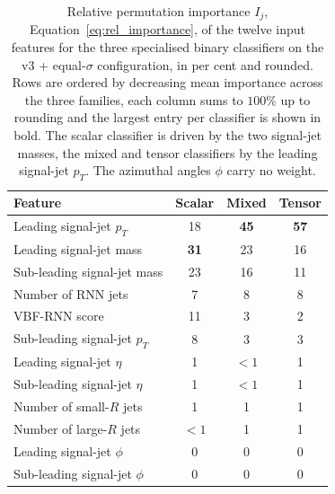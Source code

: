 \begin{table}[htbp]
  \centering
  \caption{Relative permutation importance $I_j$, Equation~\eqref{eq:rel_importance}, of the twelve input features for the three specialised binary classifiers on the v3 + equal-$\sigma$ configuration, in per cent and rounded. Rows are ordered by decreasing mean importance across the three families, each column sums to $100\%$ up to rounding and the largest entry per classifier is shown in bold. The scalar classifier is driven by the two signal-jet masses, the mixed and tensor classifiers by the leading signal-jet $p_T$. The azimuthal angles $\phi$ carry no weight.}
  \label{tab:fr_rank_spec}
  \begin{tabular}{|l|c|c|c|}
    \hline
    \textbf{Feature} & \textbf{Scalar} & \textbf{Mixed} & \textbf{Tensor} \\
    \hline
    Leading signal-jet $p_T$      & 18 & \textbf{45} & \textbf{57} \\
    Leading signal-jet mass       & \textbf{31} & 23 & 16 \\
    Sub-leading signal-jet mass   & 23 & 16 & 11 \\
    Number of RNN jets            & 7  & 8  & 8 \\
    VBF-RNN score                 & 11 & 3  & 2 \\
    Sub-leading signal-jet $p_T$  & 8  & 3  & 3 \\
    Leading signal-jet $\eta$     & 1  & $<1$ & 1 \\
    Sub-leading signal-jet $\eta$ & 1  & $<1$ & 1 \\
    Number of small-$R$ jets      & 1  & 1  & 1 \\
    Number of large-$R$ jets      & $<1$ & 1 & 1 \\
    Leading signal-jet $\phi$     & 0  & 0  & 0 \\
    Sub-leading signal-jet $\phi$ & 0  & 0  & 0 \\
    \hline
  \end{tabular}
\end{table}

